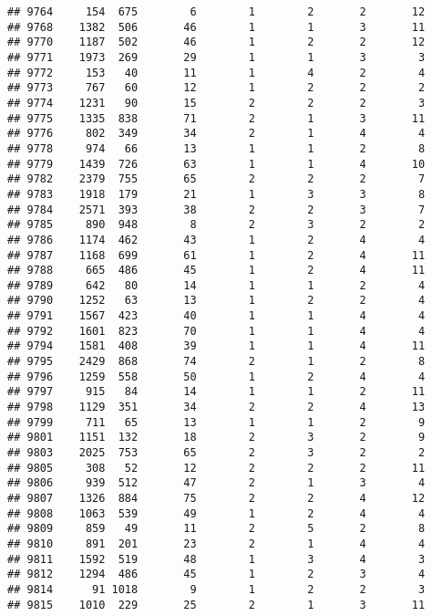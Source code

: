 \documentclass[]{article}
\begin{document}
\begin{verbatim}
## 9764     154  675        6        1        2       2       12
## 9768    1382  506       46        1        1       3       11
## 9770    1187  502       46        1        2       2       12
## 9771    1973  269       29        1        1       3        3
## 9772     153   40       11        1        4       2        4
## 9773     767   60       12        1        2       2        2
## 9774    1231   90       15        2        2       2        3
## 9775    1335  838       71        2        1       3       11
## 9776     802  349       34        2        1       4        4
## 9778     974   66       13        1        1       2        8
## 9779    1439  726       63        1        1       4       10
## 9782    2379  755       65        2        2       2        7
## 9783    1918  179       21        1        3       3        8
## 9784    2571  393       38        2        2       3        7
## 9785     890  948        8        2        3       2        2
## 9786    1174  462       43        1        2       4        4
## 9787    1168  699       61        1        2       4       11
## 9788     665  486       45        1        2       4       11
## 9789     642   80       14        1        1       2        4
## 9790    1252   63       13        1        2       2        4
## 9791    1567  423       40        1        1       4        4
## 9792    1601  823       70        1        1       4        4
## 9794    1581  408       39        1        1       4       11
## 9795    2429  868       74        2        1       2        8
## 9796    1259  558       50        1        2       4        4
## 9797     915   84       14        1        1       2       11
## 9798    1129  351       34        2        2       4       13
## 9799     711   65       13        1        1       2        9
## 9801    1151  132       18        2        3       2        9
## 9803    2025  753       65        2        3       2        2
## 9805     308   52       12        2        2       2       11
## 9806     939  512       47        2        1       3        4
## 9807    1326  884       75        2        2       4       12
## 9808    1063  539       49        1        2       4        4
## 9809     859   49       11        2        5       2        8
## 9810     891  201       23        2        1       4        4
## 9811    1592  519       48        1        3       4        3
## 9812    1294  486       45        1        2       3        4
## 9814      91 1018        9        1        2       2        3
## 9815    1010  229       25        2        1       3       11

\end{verbatim}
\end{document}
